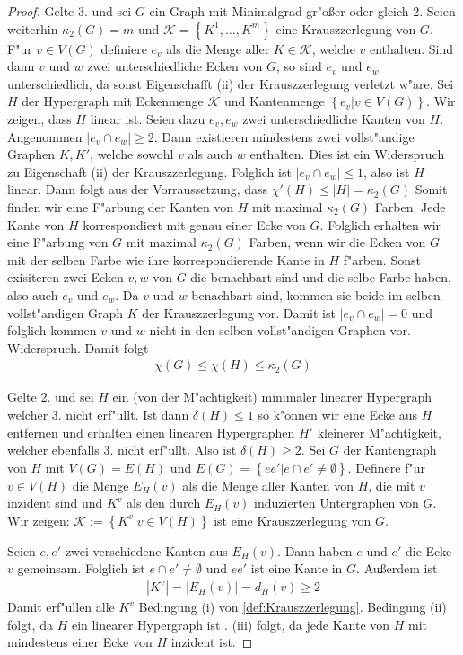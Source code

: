 \begin{proof}
  Gelte 3. und sei $G$ ein Graph mit Minimalgrad gr"o{\ss}er oder gleich $2$. Seien weiterhin $\kappa_{2}(G) = m $ und $\mathcal{K}= \left\{ K^{1},\dots,K^{m} \right\}$ eine Krauszzerlegung von $G$. 
  F"ur $v\in V(G)$ definiere $e_v$ als die Menge aller $K\in \mathcal{K}$, welche $v$ enthalten. Sind dann $v$ und $w$ zwei unterschiedliche Ecken von $G$, so sind $e_v$ und $e_{w}$ unterschiedlich, da sonst Eigenschafft (ii) der Krauszzerlegung verletzt w"are. 
  Sei $H$ der Hypergraph mit Eckenmenge $\mathcal{K}$ und Kantenmenge $\left\{ e_v| v\in V(G) \right\}$. 
  Wir zeigen, dass $H$ linear ist. 
  Seien dazu $e_{v},e_{w} $ zwei unterschiedliche Kanten von $H$.
  Angenommen $|e_{v}\cap e_{w}| \geq 2$. Dann existieren mindestens zwei vollst"andige Graphen $K,K'$, welche sowohl $v$ als auch $w$ enthalten. Dies ist ein Widerspruch zu Eigenschaft (ii) der Krauszzerlegung. Folglich ist $|e_{v}\cap e_{w}| \leq 1$, also ist $H$ linear. Dann folgt aus der Vorraussetzung, dass $\chi'(H) \leq |H| = \kappa_{2}(G)$ 
  Somit finden wir eine F"arbung der Kanten von $H$ mit maximal $\kappa_{2}(G)$ Farben. Jede Kante von $H$ korrespondiert mit genau einer Ecke von $G$. Folglich erhalten wir eine F"arbung von $G$ mit maximal $\kappa_{2}(G)$ Farben, wenn wir die Ecken von $G$ mit der selben Farbe wie ihre korrespondierende Kante in $H$ f"arben.  Sonst exisiteren zwei Ecken $v,w$ von $G$ die benachbart sind und die selbe Farbe haben, 
  also auch $e_v$ und $e_w$. Da $v$ und $w$ benachbart sind, kommen sie beide im selben vollst"andigen Graph $K$ der Krauszzerlegung vor. Damit ist $|e_v\cap e_w| = 0$ und folglich kommen $v$ und $w$ nicht in den selben vollst"andigen Graphen vor. Widerspruch. Damit folgt
  \begin{align*}
    \chi(G) \leq \chi(H) \leq \kappa_{2}(G)
  \end{align*}

  Gelte 2. und sei $H$ ein (von der M"achtigkeit) minimaler linearer Hypergraph welcher 3. nicht erf"ullt. Ist dann $\delta(H) \leq 1$ so k"onnen wir eine Ecke aus $H$ entfernen und erhalten einen linearen Hypergraphen $H'$ kleinerer M"achtigkeit, welcher ebenfalls 3. nicht erf"ullt. Also ist $\delta(H) \geq 2$. Sei $G$ der Kantengraph von $H$ mit $V(G) = E(H)$ und $E(G) = \left\{ ee'|e\cap e' \neq \emptyset \right\}$. Definere f"ur $v\in V(H)$ die Menge $E_{H}(v)$ als die Menge aller
  Kanten von $H$, die mit $v$ inzident sind und $K^{v}$ als den durch $E_H(v)$ induzierten Untergraphen von $G$.
  Wir zeigen: $\mathcal K := \left\{ K^{v}| v \in V(H) \right\}$ ist eine Krauszzerlegung von $G$.  

  Seien $e,e'$ zwei verschiedene Kanten aus $E_{H}(v)$. Dann haben $e$ und $e'$ die Ecke $v$ gemeinsam. Folglich ist $e\cap e' \neq \emptyset$ und $ee'$ ist eine Kante in $G$. Au{\ss}erdem ist 
  \begin{align*}
    |K^{v}| = |E_H(v)| = d_{H}(v) \geq 2
  \end{align*}
  Damit erf"ullen alle $K^{v}$ Bedingung (i) von \ref{def:Krauszzerlegung}. Bedingung (ii) folgt, da $H$ ein linearer Hypergraph ist . (iii) folgt, da jede Kante von $H$ mit mindestens einer Ecke von $H$ inzident ist.
\end{proof}
